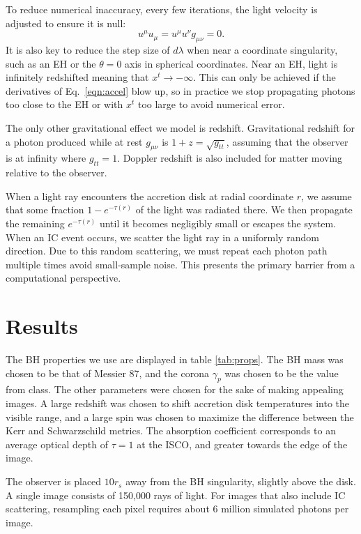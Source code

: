 \documentclass[twocolumn,twocolappendix]{aastex631}
\begin{document}
To reduce numerical inaccuracy, every few iterations, the light velocity is adjusted to ensure it is null:
\begin{equation}
  u^\mu u_\mu = u^\mu u^\nu g_{\mu\nu} = 0.
\end{equation}
It is also key to reduce the step size of $d\lambda$ when near a coordinate singularity, such as an EH or the $\theta=0$ axis in spherical coordinates. Near an EH, light is infinitely redshifted meaning that $x^t \rightarrow -\infty$. This can only be achieved if the derivatives of Eq.~\ref{eqn:accel} blow up, so in practice we stop propagating photons too close to the EH or with $x^t$ too large to avoid numerical error.

The only other gravitational effect we model is redshift. Gravitational redshift for a photon produced while at rest $g_{\mu\nu}$ is $1 + z = \sqrt{g_{tt}}$, assuming that the observer is at infinity where $g_{tt} = 1$. Doppler redshift is also included for matter moving relative to the observer.

When a light ray encounters the accretion disk at radial coordinate $r$, we assume that some fraction $1-e^{-\tau(r)}$ of the light was radiated there. We then propagate the remaining $e^{-\tau(r)}$ until it becomes negligibly small or escapes the system. When an IC event occurs, we scatter the light ray in a uniformly random direction. Due to this random scattering, we must repeat each photon path multiple times avoid small-sample noise. This presents the primary barrier from a computational perspective.


\section{Results}
\label{sec:results}
The BH properties we use are displayed in table \ref{tab:props}. The BH mass was chosen to be that of Messier 87, and the corona $\gamma_p$ was chosen to be the value from class. The other parameters were chosen for the sake of making appealing images. A large redshift was chosen to shift accretion disk temperatures into the visible range, and a large spin was chosen to maximize the difference between the Kerr and Schwarzschild metrics. The absorption coefficient corresponds to an average optical depth of $\tau = 1$ at the ISCO, and greater towards the edge of the image.

The observer is placed $10r_s$ away from the BH singularity, slightly above the disk. A single image consists of 150,000 rays of light. For images that also include IC scattering, resampling each pixel requires about 6 million simulated photons per image.
\end{document}
